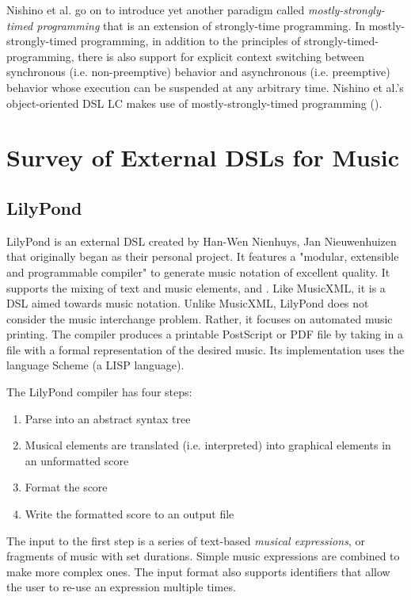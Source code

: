 \documentclass{report}
\newcommand\citeparen[1]{(\cite{#1})}
\begin{document}
Nishino et al. go on to introduce yet another paradigm called  \textit{mostly-strongly-timed programming} that is an extension of strongly-time programming. In mostly-strongly-timed programming, in addition to the principles of strongly-timed-programming, there is also support for  explicit  context  switching  between synchronous (i.e. non-preemptive) behavior and asynchronous (i.e. preemptive) behavior whose execution can be suspended at any arbitrary  time. Nishino et al.'s object-oriented DSL LC makes use of mostly-strongly-timed programming \citeparen{nishino_2012}.

\section{Survey of External DSLs for Music}
\label{sec:external}

\subsection{LilyPond}
LilyPond is an external DSL created by Han-Wen Nienhuys, Jan Nieuwenhuizen that originally began as their personal project. It features a "modular, extensible and programmable compiler" to generate music notation of excellent quality. It supports the mixing of text and music elements, and .   Like MusicXML, it is a DSL aimed towards music notation. Unlike MusicXML, LilyPond does not consider the music interchange problem. Rather, it focuses on automated music printing. The compiler produces a printable PostScript or PDF file by taking in a file with a formal representation of the desired music. Its implementation uses the language Scheme (a LISP language). 

The LilyPond compiler has four steps:
\begin{enumerate}[noitemsep]
\item Parse into an abstract syntax tree
\item Musical elements are translated (i.e. interpreted) into graphical elements in an unformatted score
\item Format the score
\item Write the formatted score to an output file
\end{enumerate}

The input to the first step is a series of text-based \textit{musical expressions}, or fragments of music with set durations. Simple music expressions are combined to make more complex ones. The input format also supports identifiers that allow the user to re-use an expression multiple times.
\end{document}
